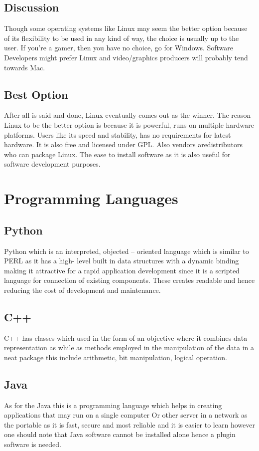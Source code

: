 \documentclass{scrreprt}
\begin{document}
\subsection{Discussion}
Though some operating systems like Linux may seem the better option because of its flexibility to be
used in any kind of way, the choice is usually up to the user. If you’re a gamer, then you have no choice,
go for Windows. Software Developers might prefer Linux and video/graphics producers will probably
tend towards Mac.

\subsection{Best Option}
After all is said and done, Linux eventually comes out as the winner. The reason Linux to be the better
option is because it is powerful, runs on multiple hardware platforms. Users like its speed and stability,
has no requirements for latest hardware. It is also free and licensed under GPL. Also vendors aredistributors who can package Linux. The ease to install software as it is also useful for software
development purposes.


\section{Programming Languages}

\subsection{Python}
Python which is an interpreted, objected – oriented language which is similar to PERL as it has a high-
level built in data structures with a dynamic binding making it attractive for a rapid application
development since it is a scripted language for connection of existing components. These creates
readable and hence reducing the cost of development and maintenance.

\subsection{C++}
C++ has classes which used in the form of an objective where it combines data representation as while
as methods employed in the manipulation of the data in a neat package this include arithmetic, bit
manipulation, logical operation.

\subsection{Java}
As for the Java this is a programming language which helps in creating applications that may run on a
single computer Or other server in a network as the portable as it is fast, secure and most reliable and it
is easier to learn however one should note that Java software cannot be installed alone hence a plugin
software is needed.
\end{document}
